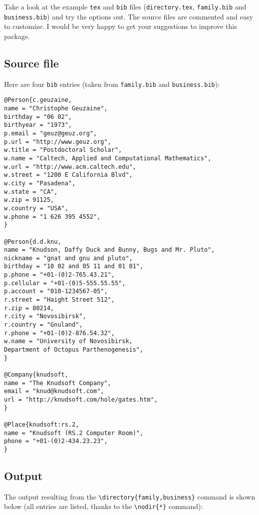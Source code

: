 \documentclass[10pt]{article}
\begin{document}
Take a look at the example \texttt{tex} and \texttt{bib}
files (\texttt{directory.tex}, \texttt{family.bib} and
\texttt{business.bib}) and try the options out. The source files are
commented and easy to customize. I would be very happy to get your suggestions
to improve this package.

\subsection{Source file}

Here are four \texttt{bib} entries (taken from \texttt{family.bib} and
\texttt{business.bib}):

\begin{verbatim}
@Person{c.geuzaine,
name = "Christophe Geuzaine",
birthday = "06 02",
birthyear = "1973",
p.email = "geuz@geuz.org",
p.url = "http://www.geuz.org",
w.title = "Postdoctoral Scholar",
w.name = "Caltech, Applied and Computational Mathematics",
w.url = "http://www.acm.caltech.edu",
w.street = "1200 E California Blvd",
w.city = "Pasadena",
w.state = "CA",
w.zip = 91125,
w.country = "USA",
w.phone = "1 626 395 4552",
}

@Person{d.d.knu,
name = "Knudson, Daffy Duck and Bunny, Bugs and Mr. Pluto",
nickname = "gnat and gnu and pluto",
birthday = "10 02 and 05 11 and 01 01",
p.phone = "+01-(0)2-765.43.21",
p.cellular = "+01-(0)5-555.55.55",
p.account = "010-1234567-05",
r.street = "Haight Street 512",
r.zip = 80214,
r.city = "Novosibirsk",
r.country = "Gnuland",
r.phone = "+01-(0)2-876.54.32",
w.name = "University of Novosibirsk,
Department of Octopus Parthenogenesis",
}

@Company{knudsoft,
name = "The Knudsoft Company",
email = "knud@knudsoft.com",
url = "http://knudsoft.com/hole/gates.htm",
}

@Place{knudsoft:rs.2,
name = "Knudsoft (RS.2 Computer Room)",
phone = "+01-(0)2-434.23.23",
}
\end{verbatim}

\subsection{Output}
\label{sec:output}

The output resulting from the \verb'\directory{family,business}' command is
shown below (all entries are listed, thanks to the \verb'\nodir{*}' command):

\nodir{*}

\end{document}
